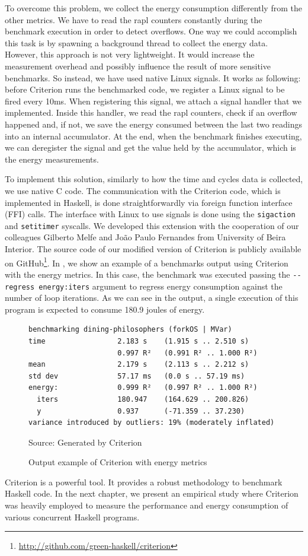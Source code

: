 To overcome this problem, we collect the energy consumption differently from the other metrics. We have to read the \ac{rapl} counters constantly during the benchmark execution in order to detect overflows. One way we could accomplish this task is by spawning a background thread to collect the energy data. However, this approach is not very lightweight. It would increase the measurement overhead and possibly influence the result of more sensitive benchmarks. So instead, we have used native Linux signals. It works as following: before Criterion runs the benchmarked code, we register a Linux signal to be fired every 10ms. When registering this signal, we attach a signal handler that we implemented. Inside this handler, we read the \ac{rapl} counters, check if an overflow happened and, if not, we save the energy consumed between the last two readings into an internal accumulator. At the end, when the benchmark finishes executing, we can deregister the signal and get the value held by the accumulator, which is the energy measurements.

To implement this solution, similarly to how the time and cycles data is collected, we use native C code. The communication with the Criterion code, which is implemented in Haskell, is done straightforwardly via foreign function interface (FFI) calls. The interface with Linux to use signals is done using the \texttt{sigaction} and \texttt{setitimer} syscalls. We developed this extension with the cooperation of our colleagues Gilberto Melfe and João Paulo Fernandes from University of Beira Interior. The source code of our modified version of Criterion is publicly available on GitHub\footnote{\url{http://github.com/green-haskell/criterion}}. In , we show an example of a benchmarks output using Criterion with the energy metrics. In this case, the benchmark was executed passing the \texttt{-{}-regress energy:iters} argument to regress energy consumption against the number of loop iterations. As we can see in the output, a single execution of this program is expected to consume 180.9 joules of energy.

\begin{figure}[htp]
  \centering
  \caption{Output example of Criterion with energy metrics}
	\begin{verbatim}
benchmarking dining-philosophers (forkOS | MVar)
time                 2.183 s    (1.915 s .. 2.510 s)
                     0.997 R²   (0.991 R² .. 1.000 R²)
mean                 2.179 s    (2.113 s .. 2.212 s)
std dev              57.17 ms   (0.0 s .. 57.19 ms)
energy:              0.999 R²   (0.997 R² .. 1.000 R²)
  iters              180.947    (164.629 .. 200.826)
  y                  0.937      (-71.359 .. 37.230)
variance introduced by outliers: 19% (moderately inflated)
  \end{verbatim}
  \footnotesize{Source: Generated by Criterion}
  \label{fig:fib-energy-output}
\end{figure}

Criterion is a powerful tool. It provides a robust methodology to benchmark Haskell code. In the next chapter, we present an empirical study where Criterion was heavily employed to measure the performance and energy consumption of various concurrent Haskell programs.

